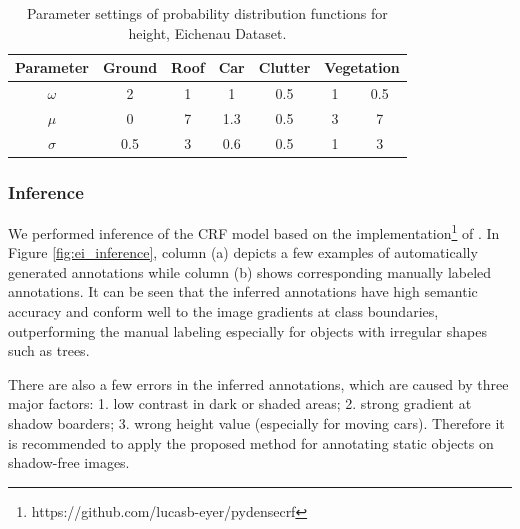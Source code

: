 \begin{table}[htbp]
  \centering
  \caption{Parameter settings of probability distribution functions for height, Eichenau Dataset.}
    \begin{tabular}{c|c|c|c|c|c|c}
    \hline
    \textbf{Parameter} & \textbf{Ground} & \textbf{Roof} & \textbf{Car}  & \textbf{Clutter} & \multicolumn{2}{c}{\textbf{Vegetation}} \\
          
    \hline
    $\omega$     & 2     & 1     & 1     & 0.5  &1  & 0.5\\
    
    $\mu$     & 0     & 7   & 1.3     & 0.5  &3  & 7\\
    
    $\sigma$ & 0.5   & 3  & 0.6     & 0.5  &1  & 3\\
    \hline
    \end{tabular}%
  \label{tab:ei_para_h}%
\end{table}%

\subsubsection{Inference}We performed inference of the CRF model based on the implementation\footnote{https://github.com/lucasb-eyer/pydensecrf} of \cite{crf2012}. In Figure \ref{fig:ei_inference}, column (a) depicts a few examples of automatically generated annotations while column (b) shows corresponding manually labeled annotations. It can be seen that the inferred annotations have high semantic accuracy and conform well to the image gradients at class boundaries, outperforming the manual labeling especially for objects with irregular shapes such as trees. 

There are also a few errors in the inferred annotations, which are caused by three major factors: 1. low contrast in dark or shaded areas; 2. strong gradient at shadow boarders; 3. wrong height value (especially for moving cars). Therefore it is recommended to apply the proposed method for annotating static objects on shadow-free images.

